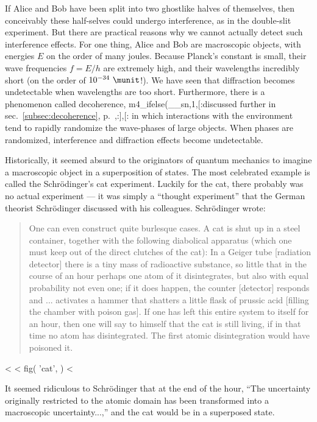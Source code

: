 If Alice and Bob have been split into two ghostlike halves of
themselves, then conceivably these half-selves could undergo
interference, as in the double-slit experiment. But there are
practical reasons why we cannot actually detect such interference
effects. For one thing, Alice and Bob are macroscopic objects, with
energies $E$ on the order of many joules. Because Planck's constant is
small, their wave frequencies $f=E/h$ are extremely high, and their
wavelengths incredibly short (on the order of $10^{-34}\ \munit$!). We
have seen that diffraction becomes undetectable when wavelengths are
too short.  Furthermore, there is a phenomenon called decoherence,\label{decoherence-brief}
m4_ifelse(__sn,1,[:discussed further in sec.~\ref{subsec:decoherence}, p.~\pageref{subsec:decoherence},:],[:%
in which interactions with the environment tend to rapidly randomize
the wave-phases of large objects. When phases are randomized,
interference and diffraction effects become undetectable. 

Historically, it seemed absurd to the originators of quantum mechanics
to imagine a macroscopic object in a superposition of states.
The most celebrated example is called the Schr\"odinger's cat\label{schrodingers-cat}
experiment. Luckily for the cat, there probably was no
actual experiment --- it was simply a ``thought experiment''
that the German theorist Schr\"odinger discussed
with his colleagues. Schr\"odinger wrote:

\begin{quote}
One can even construct quite burlesque cases. A cat is shut
up in a steel container, together with the following
diabolical apparatus (which one must keep out of the direct
clutches of the cat): In a Geiger tube [radiation detector]
there is a tiny mass of radioactive substance, so little
that in the course of an hour perhaps one atom of it
disintegrates, but also with equal probability not even one;
if it does happen, the counter [detector] responds and ...
activates a hammer that shatters a little flask of prussic
acid [filling the chamber with poison gas]. If one has left
this entire system to itself for an hour, then one will say
to himself that the cat is still living, if in that time no
atom has disintegrated. The first atomic disintegration
would have poisoned it.
\end{quote}

<%
<%
  fig(
    'cat',
  )
<%

\noindent It seemed ridiculous to Schr\"odinger that at the end of
the hour, ``The uncertainty originally restricted to the atomic domain
has been transformed into a macroscopic uncertainty...,'' and the cat
would be in a superposed state. 

